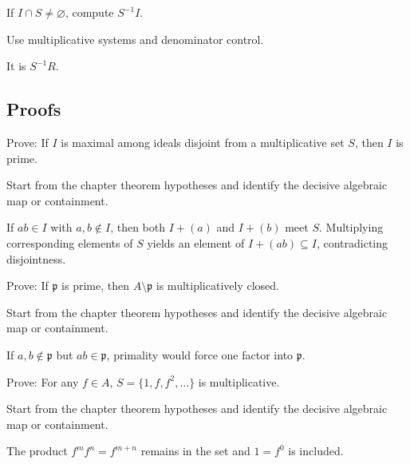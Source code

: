 \begin{exercise}\label{exr:v05-expand-05}
If $I\cap S\ne\varnothing$, compute $S^{-1}I$.
\end{exercise}
\begin{hint}
Use multiplicative systems and denominator control.
\end{hint}
\begin{solution}
It is $S^{-1}R$.
\end{solution}

\subsection*{Proofs}

\begin{exercise}\label{exr:v05-expand-06}
Prove: If $I$ is maximal among ideals disjoint from a multiplicative set $S$, then $I$ is prime.
\end{exercise}
\begin{hint}
Start from the chapter theorem hypotheses and identify the decisive algebraic map or containment.
\end{hint}
\begin{solution}
If $ab\in I$ with $a,b\notin I$, then both $I+(a)$ and $I+(b)$ meet $S$. Multiplying corresponding elements of $S$ yields an element of $I+(ab)\subseteq I$, contradicting disjointness.
\end{solution}

\begin{exercise}\label{exr:v05-expand-07}
Prove: If $\mathfrak p$ is prime, then $A\setminus\mathfrak p$ is multiplicatively closed.
\end{exercise}
\begin{hint}
Start from the chapter theorem hypotheses and identify the decisive algebraic map or containment.
\end{hint}
\begin{solution}
If $a,b\notin\mathfrak p$ but $ab\in\mathfrak p$, primality would force one factor into $\mathfrak p$.
\end{solution}

\begin{exercise}\label{exr:v05-expand-08}
Prove: For any $f\in A$, $S=\{1,f,f^2,\dots\}$ is multiplicative.
\end{exercise}
\begin{hint}
Start from the chapter theorem hypotheses and identify the decisive algebraic map or containment.
\end{hint}
\begin{solution}
The product $f^m f^n=f^{m+n}$ remains in the set and $1=f^0$ is included.
\end{solution}

